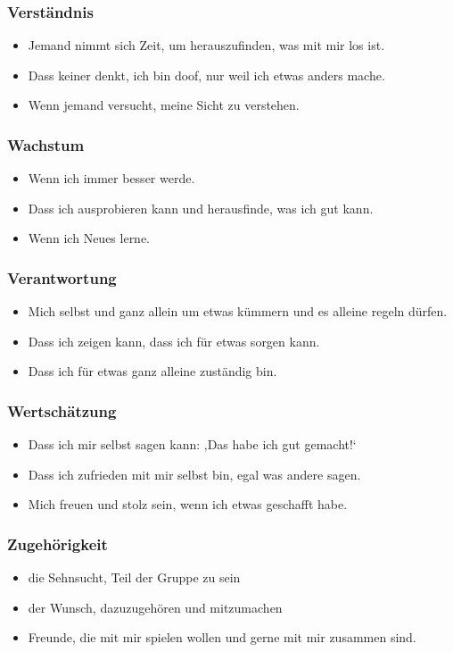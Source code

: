 \subsubsection{Verständnis}

\begin{itemize}
    \item Jemand nimmt sich Zeit, um herauszufinden, was mit mir los ist.
    \item Dass keiner denkt, ich bin doof, nur weil ich etwas anders mache.
    \item Wenn jemand versucht, meine Sicht zu verstehen.
\end{itemize}

\subsubsection{Wachstum}

\begin{itemize}
    \item Wenn ich immer besser werde.
    \item Dass ich ausprobieren kann und herausfinde, was ich gut kann.
    \item Wenn ich Neues lerne.
\end{itemize}

\subsubsection{Verantwortung}

\begin{itemize}
    \item Mich selbst und ganz allein um etwas kümmern und es alleine regeln dürfen.
    \item Dass ich zeigen kann, dass ich für etwas sorgen kann.
    \item Dass ich für etwas ganz alleine zuständig bin.
\end{itemize}

\subsubsection{Wertschätzung}

\begin{itemize}
    \item Dass ich mir selbst sagen kann: ‚Das habe ich gut gemacht!‘
    \item Dass ich zufrieden mit mir selbst bin, egal was andere sagen.
    \item Mich freuen und stolz sein, wenn ich etwas geschafft habe.
\end{itemize}

\subsubsection{Zugehörigkeit}

\begin{itemize}
    \item die Sehnsucht, Teil der Gruppe zu sein
    \item der Wunsch, dazuzugehören und mitzumachen
    \item Freunde, die mit mir spielen wollen und gerne mit mir zusammen sind.
\end{itemize}
